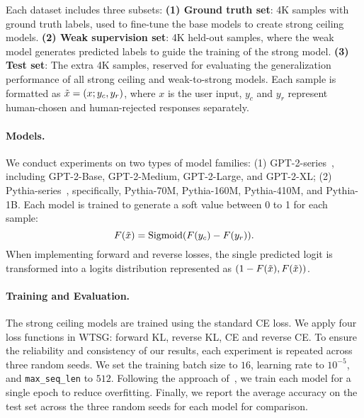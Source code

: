 Each dataset includes three subsets: \textbf{(1) Ground truth set}: 4K samples with ground truth labels, used to fine-tune the base models to create strong ceiling models.
\textbf{(2) Weak supervision set}: 4K held-out samples, where the weak model generates predicted labels to guide the training of the strong model.
\textbf{(3) Test set}: The extra 4K samples, reserved for evaluating the generalization performance of all strong ceiling and weak-to-strong models. 
Each sample is formatted as $\Tilde{x}=(x;y_c,y_r)$, where $x$ is the user input, $y_c$ and $y_r$ represent human-chosen and human-rejected responses separately.



\paragraph{Models.}
We conduct experiments on two types of model families: 
(1) GPT-2-series~\citep{radford2019language}, including GPT-2-Base, GPT-2-Medium, GPT-2-Large, and GPT-2-XL; 
(2) Pythia-series~\citep{biderman2023pythia}, specifically, Pythia-70M, Pythia-160M, Pythia-410M, and Pythia-1B. 
Each model is trained to generate a soft value between 0 to 1 for each sample: $$F(\Tilde{x}) = \text{Sigmoid}(F(y_c)-F(y_r)).$$
When implementing forward and reverse losses, the single predicted logit is transformed into a logits distribution represented as $(1 - F(\Tilde{x}), F(\Tilde{x}))$.


\paragraph{Training and Evaluation.}
The strong ceiling models are trained using the standard CE loss. We apply four loss functions in WTSG: forward KL, reverse KL, CE and reverse CE.
To ensure the reliability and consistency of our results, each experiment is repeated across three random seeds.
We set the training batch size to $16$, learning rate to $10^{-5}$, and \texttt{max\_seq\_len} to $512$.
Following the approach of~\citet{burns2023weak}, we train each model for a single epoch to reduce overfitting.
Finally, we report the average accuracy on the test set across the three random seeds for each model for comparison.










